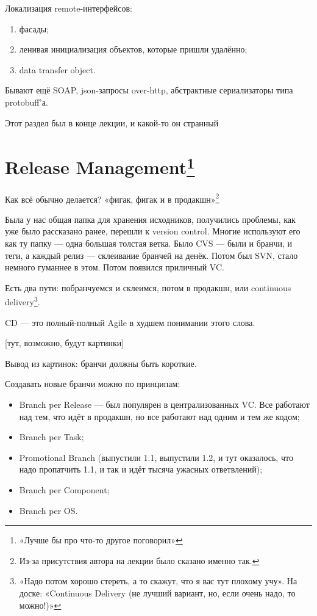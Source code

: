 \documentclass[11pt,a4paper]{article}
\begin{document}
Локализация remote-интерфейсов:
\begin{enumerate}
\item фасады;
\item ленивая инициализация объектов, которые пришли удалённо;
\item data transfer object.
\end{enumerate}

Бывают ещё SOAP, json-запросы over-http, абстрактные сериализаторы типа protobuff'а.

Этот раздел был в конце лекции, и какой-то он странный

\section{Release Management\footnote{«Лучше бы про что-то другое поговорил»}}
Как всё обычно делается? «фигак, фигак и в продакшн»\footnote{Из-за присутствия автора на лекции было сказано именно так.}

Была у нас общая папка для хранения исходников, получились проблемы, как уже было рассказано ранее, перешли к version control. Многие используют его как ту папку — одна большая толстая ветка. Было CVS — были и бранчи, и теги, а каждый релиз — склеивание бранчей на денёк. Потом был SVN, стало немного гуманнее в этом. Потом появился приличный VC.

Есть два пути: побранчуемся и склеимся, потом в продакшн, или continuous delivery\footnote{«Надо потом хорошо стереть, а то скажут, что я вас тут плохому учу». На доске: «Continuous Delivery (не лучший вариант, но, если очень надо, то можно!)»}.

CD — это полный-полный Agile в худшем понимании этого слова.

[тут, возможно, будут картинки]

Вывод из картинок: бранчи должны быть короткие.

Создавать новые бранчи можно по принципам:
\begin{itemize}
\item Branch per Release — был популярен в централизованных VC. Все работают над тем, что идёт в продакшн, но все работают над одним и тем же кодом;
\item Branch per Task;
\item Promotional Branch (выпустили 1.1, выпустили 1.2, и тут оказалось, что надо пропатчить 1.1, и так и идёт тысяча ужасных ответвлений);
\item Branch per Component;
\item Branch per OS.
\end{itemize}
\end{document}
